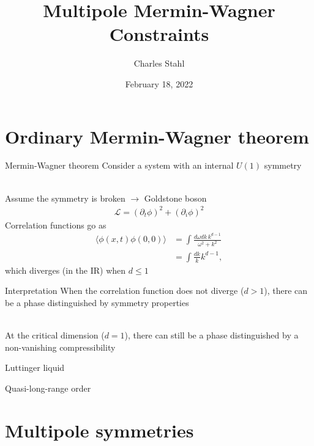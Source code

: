 \documentclass{beamer}
\title{Multipole Mermin-Wagner Constraints}
\subtitle{}
\author{Charles Stahl}
\institute{University of Colorado \\ Department of Physics}
\date{February 18, 2022}
\renewcommand{\L}{\mathcal{L}}
\begin{document}
\frame{\titlepage}

%
%
%
%

\section{Ordinary Mermin-Wagner theorem}

\begin{frame}{Mermin-Wagner theorem}
Consider a system with an internal $U(1)$ symmetry\\\

Assume the symmetry is broken $\rightarrow$ Goldstone boson
\begin{align*}
\L = (\partial_t \phi)^2 + (\partial_i \phi)^2
\end{align*}
Correlation functions go as
\begin{align*}
\langle \phi(x,t) \phi(0,0) \rangle &= \int \frac{d\omega dk \, k^{d-1}}{\omega^2+ k^2}\\ 
&= \int \frac{dk}{k} k^{d-1},
\end{align*}
which diverges (in the IR) when $d\le 1$
\end{frame}

\begin{frame}{Interpretation}
When the correlation function does not diverge ($d>1$), there can be a phase distinguished by symmetry properties\\\

At the critical dimension ($d=1$), there can still be a phase distinguished by a non-vanishing compressibility

\setlength{\leftskip}{1cm}

Luttinger liquid

Quasi-long-range order
\end{frame}

\section{Multipole symmetries}
\end{document}
